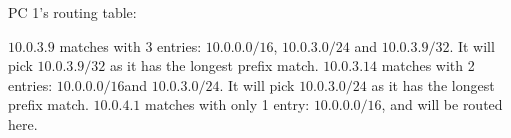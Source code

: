 PC 1's routing table:

$10.0.3.9$ matches with 3 entries: $10.0.0.0 / 16$, $10.0.3.0 / 24$ and $10.0.3.9 / 32$. It will pick $10.0.3.9 / 32$ as it has the longest prefix match.
$10.0.3.14$ matches with 2 entries: $10.0.0.0 / 16$and $10.0.3.0 / 24$. It will pick $10.0.3.0 / 24$ as it has the longest prefix match.
$10.0.4.1$ matches with only 1 entry: $10.0.0.0 / 16$, and will be routed here.